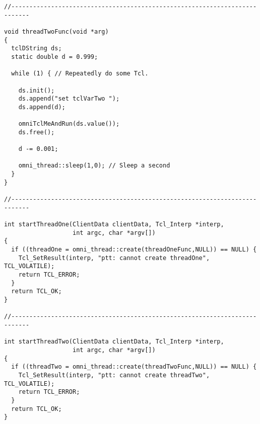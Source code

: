 \documentclass[11pt,twoside,onecolumn]{article}
\begin{document}
{\small
\begin{verbatim}
//---------------------------------------------------------------------------

void threadTwoFunc(void *arg)
{
  tclDString ds;
  static double d = 0.999;
  
  while (1) { // Repeatedly do some Tcl.

    ds.init();
    ds.append("set tclVarTwo ");
    ds.append(d);
    
    omniTclMeAndRun(ds.value());
    ds.free();

    d -= 0.001;
    
    omni_thread::sleep(1,0); // Sleep a second
  }
}

//---------------------------------------------------------------------------

int startThreadOne(ClientData clientData, Tcl_Interp *interp,
                   int argc, char *argv[])
{
  if ((threadOne = omni_thread::create(threadOneFunc,NULL)) == NULL) {
    Tcl_SetResult(interp, "ptt: cannot create threadOne", TCL_VOLATILE);
    return TCL_ERROR;
  }
  return TCL_OK;
}

//---------------------------------------------------------------------------

int startThreadTwo(ClientData clientData, Tcl_Interp *interp,
                   int argc, char *argv[])
{
  if ((threadTwo = omni_thread::create(threadTwoFunc,NULL)) == NULL) {
    Tcl_SetResult(interp, "ptt: cannot create threadTwo", TCL_VOLATILE);
    return TCL_ERROR;
  }
  return TCL_OK;
}
\end{verbatim}
}
\newpage
\end{document}

